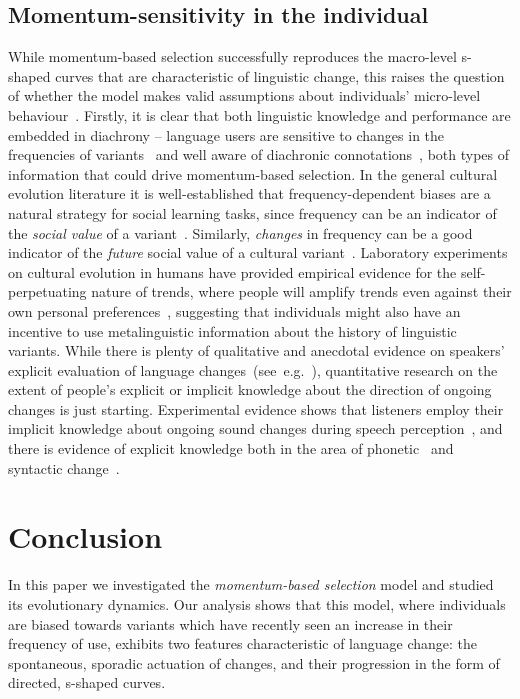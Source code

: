 \documentclass[10pt]{article}
\begin{document}
\subsection{Momentum-sensitivity in the individual}

While momentum-based selection successfully reproduces the macro-level s-shaped curves that are characteristic of linguistic change, this raises the question of whether the model makes valid assumptions about individuals' micro-level behaviour~\citep{Mesoudi2009}. Firstly, it is clear that both linguistic knowledge and performance are embedded in diachrony -- language users are sensitive to changes in the frequencies of variants~\citep{Jaeger2013} and well aware of diachronic connotations~\citep{Labov2001,Guy2003,Tagliamonte2012}, 
both types of information that could drive momentum-based selection. In the general cultural evolution literature it is well-established that frequency-dependent biases are a natural strategy for social learning tasks, since frequency can be an indicator of the \emph{social value} of a variant~\citep{Boyd1985}. Similarly, \emph{changes} in frequency can be a good indicator of the \emph{future} social value of a cultural variant~\citep{Gureckis2009}. Laboratory experiments on cultural evolution in humans have provided empirical evidence for the self-perpetuating nature of trends, where people will amplify trends even against their own personal preferences~\citep{Salganik2008,Willer2009}, suggesting that individuals might also have an incentive to use metalinguistic information about the history of linguistic variants. While there is plenty of qualitative and anecdotal evidence on speakers' explicit evaluation of language changes~(see~e.g.~\citealt{Trudgill1972,Labov2001,Guy2003,Tagliamonte2012}), quantitative research on the extent of people's explicit or implicit knowledge about the direction of ongoing changes is just starting. Experimental evidence shows that listeners employ their implicit knowledge about ongoing sound changes during speech perception~\citep{Hay2006,Drager2011}, and there is evidence of explicit knowledge both in the area of phonetic~\citep{Carrera-Sabate2014} and syntactic change~\citep{Stadler2016Evolang}. 


\section{Conclusion}

In this paper we investigated the \emph{momentum-based selection} model and studied its evolutionary dynamics. Our analysis shows that this model, where individuals are biased towards variants which have recently seen an increase in their frequency of use, exhibits two features characteristic of language change: the spontaneous, sporadic actuation of changes, and their progression in the form of directed, s-shaped curves.
\end{document}
